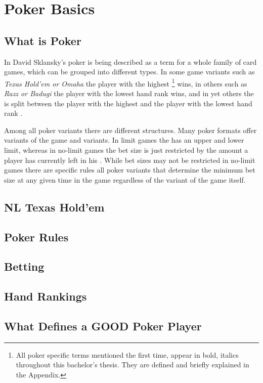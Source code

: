 

\chapter{Poker Basics}
\label{cha:pokerBasics}

\section{What is Poker}
In David Sklansky's \cite{theory_of_poker} poker is being described as a term for a whole family of card games, which can be grouped into different types. In some game variants such as  \textit{Texas Hold'em or Omaha} the player with the highest \footnote{All poker specific terms mentioned the first time, appear in bold, italics throughout this bachelor's thesis. They are defined and briefly explained in the Appendix.} wins, in others such as \textit{Razz or Badugi} the player with the lowest hand rank wins, and in yet others the  is split between the player with the highest and the player with the lowest hand rank .\par
Among all poker variants there are different  structures. Many poker formats offer  variants of the game and  variants. In limit games the  has an upper and lower limit, whereas in no-limit games the bet size is just restricted by the amount a player has currently left in his  \cite{theory_of_poker}. While bet sizes may not be restricted in no-limit games there are specific rules  all poker variants that determine the minimum bet size at any given time in the game regardless of the variant of the game itself.
\section{NL Texas Hold'em}

\section{Poker Rules}
\section{Betting}
\section{Hand Rankings}
\section{What Defines a GOOD Poker Player}

